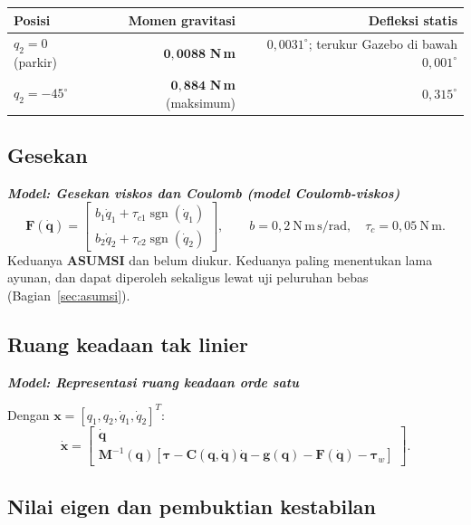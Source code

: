 \documentclass[11pt,a4paper]{article}
\newcommand{\degg}{^\circ}
\newcommand{\model}[1]{\textbf{\textit{Model: #1}}}
\begin{document}
\begin{longtable}{l r r}
\toprule
\textbf{Posisi} & \textbf{Momen gravitasi} & \textbf{Defleksi statis} \\
\midrule
$q_2 = 0$ (parkir) & $\bm{0{,}0088}$ \textbf{N\,m} & $0{,}0031\degg$; terukur Gazebo di bawah $0{,}001\degg$ \\
$q_2 = -45\degg$ & $\bm{0{,}884}$ \textbf{N\,m} (maksimum) & $0{,}315\degg$ \\
\bottomrule
\end{longtable}

\subsection{Gesekan}

\model{Gesekan viskos dan Coulomb (model Coulomb-viskos)}
\begin{equation}
\bm{F}(\dot{\bm{q}}) =
\begin{bmatrix} b_1 \dot q_1 + \tau_{c1}\operatorname{sgn}(\dot q_1) \\
b_2 \dot q_2 + \tau_{c2}\operatorname{sgn}(\dot q_2) \end{bmatrix},
\qquad b = 0{,}2 \ \mathrm{N\,m\,s/rad}, \quad \tau_c = 0{,}05 \ \mathrm{N\,m}.
\end{equation}
Keduanya \textbf{ASUMSI} dan belum diukur. Keduanya paling menentukan lama ayunan, dan dapat diperoleh
sekaligus lewat uji peluruhan bebas (Bagian~\ref{sec:asumsi}).

\subsection{Ruang keadaan tak linier}

\model{Representasi ruang keadaan orde satu}

Dengan $\bm{x} = [q_1, q_2, \dot q_1, \dot q_2]^T$:
\begin{equation}
\dot{\bm{x}} =
\begin{bmatrix}
\dot{\bm{q}} \\
\bm{M}^{-1}(\bm{q})\left[ \bm{\tau} - \bm{C}(\bm{q},\dot{\bm{q}})\dot{\bm{q}}
- \bm{g}(\bm{q}) - \bm{F}(\dot{\bm{q}}) - \bm{\tau}_w \right]
\end{bmatrix}.
\end{equation}

\subsection{Nilai eigen dan pembuktian kestabilan}
\end{document}
